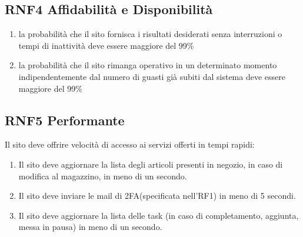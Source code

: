 \documentclass{report}
\begin{document}
\subsection*{RNF4 Affidabilità e Disponibilità}
\begin{enumerate}
	\item la probabilità che il sito fornisca i risultati desiderati senza interruzioni o tempi di inattività deve essere maggiore del 99\%
	\item la probabilità che il sito rimanga operativo in un determinato momento indipendentemente dal numero di guasti già subiti dal sistema deve essere maggiore del 99\%
	 
\end{enumerate}
\subsection*{RNF5 Performante}
Il sito deve offrire velocità di accesso ai servizi offerti in tempi rapidi:
\begin{enumerate}
	\item Il sito deve aggiornare la lista degli articoli presenti in negozio, in caso di modifica al magazzino, in meno di un secondo.
	\item Il sito deve inviare le mail di 2FA(specificata nell'RF1) in meno di 5 secondi.
	\item Il sito deve aggiornare la lista delle task (in caso di completamento, aggiunta, messa in pausa) in meno di un secondo.
\end{enumerate}
\end{document}
